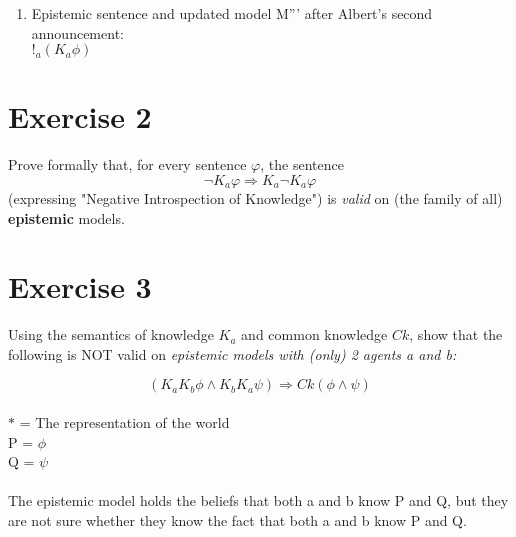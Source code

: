 \documentclass{article}
\begin{document}
\begin{enumerate}[label=(\alph*)]
    \item Epistemic sentence and updated model M''' after Albert's second announcement: \\
    $!_a (K_a \phi)$
    \begin{center}
    \end{center}

\end{enumerate}

\section{Exercise 2}
Prove formally that, for every sentence \(\varphi\), the sentence
\[\neg K_{a}\varphi \Rightarrow K_{a}\neg K_{a}\varphi\]
(expressing "Negative Introspection of Knowledge") is \textit{valid} on (the family of all) \textbf{epistemic} models.

\section{Exercise 3}
Using the semantics of knowledge \(K_{a}\) and common knowledge \(Ck\), show that the following is NOT valid on \textit{epistemic models with (only) 2 agents a and b:}

\[(K_{a}K_{b}\phi\wedge K_{b}K_{a}\psi) \Rightarrow Ck(\phi\wedge\psi)\]
\\
$*$ = The representation of the world \\
P = $ \phi $ \\
Q = $ \psi $ \\
\\
The epistemic model holds the beliefs that both a and b know P and Q, but they are not sure whether they know the fact that both a and b know P and Q.
\end{document}
